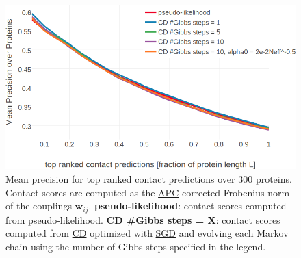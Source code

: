 \documentclass[11pt,a4paper,twoside]{book}
\newcommand{\wij}{\mathbf{w}_{ij}}
\theoremstyle{definition}
\theoremstyle{definition}
\theoremstyle{remark}
\begin{document}
\begin{figure}

{\centering \includegraphics[width=0.9\linewidth]{img/full_likelihood/gibbs_sampling/precision_vs_rank_gibbssteps} 

}

\caption{Mean precision for top ranked
contact predictions over 300 proteins. Contact scores are computed as
the \protect\hyperlink{abbrev}{APC} corrected Frobenius norm of the
couplings \(\wij\). \textbf{pseudo-likelihood}: contact scores computed
from pseudo-likelihood. \textbf{CD \#Gibbs steps = X}: contact scores
computed from \protect\hyperlink{abbrev}{CD} optimized with
\protect\hyperlink{abbrev}{SGD} and evolving each Markov chain using the
number of Gibbs steps specified in the legend.}\label{fig:precision-cd-gibbs-steps}
\end{figure}
\end{document}
